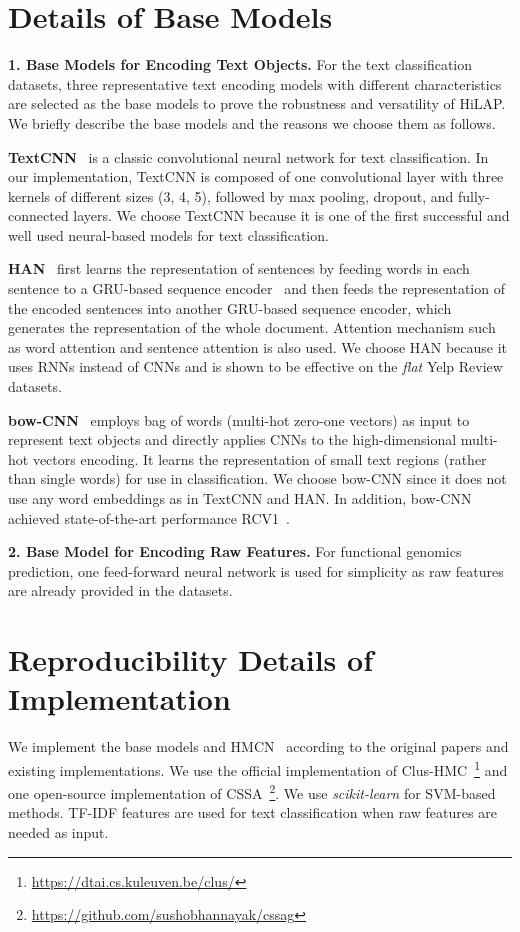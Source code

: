 \documentclass[11pt,a4paper]{article}
\begin{document}
\section{Details of Base Models}
\label{app_base}
\smallskip
\noindent
\textbf{1. Base Models for Encoding Text Objects.}
For the text classification datasets, three representative text encoding models with different characteristics are selected as the base models to prove the robustness and versatility of HiLAP.
We briefly describe the base models and the reasons we choose them as follows.

\textbf{TextCNN}~\citep{kim2014convolutional} is a classic convolutional neural network for text classification.
    In our implementation, TextCNN is composed of one convolutional layer with three kernels of different sizes (3, 4, 5), followed by max pooling, dropout, and fully-connected layers.
    We choose TextCNN because it is one of the first successful and well used neural-based models for text classification.

\textbf{HAN}~\citep{yang2016hierarchical}
    first learns the representation of sentences by feeding words in each sentence to a GRU-based sequence encoder~\citep{bahdanau2014neural} and then feeds the representation of the encoded sentences into another GRU-based sequence encoder, which generates the representation of the whole document.
    Attention mechanism such as word attention and sentence attention is also used.
    We choose HAN because it uses RNNs instead of CNNs and is shown to be effective on the \textit{flat} Yelp Review datasets.

\textbf{bow-CNN}~\citep{johnson2014effective} employs bag of words (multi-hot zero-one vectors) as input to represent text objects and directly applies CNNs to the high-dimensional multi-hot vectors encoding. It learns the representation of small text regions (rather than single words) for use in classification. We choose bow-CNN since it does not use any word embeddings as in TextCNN and HAN. In addition, bow-CNN achieved state-of-the-art performance RCV1~\citep{lewis2004rcv1}.

\smallskip
\noindent
\textbf{2. Base Model for Encoding Raw Features.}
For functional genomics prediction, one feed-forward neural network is used for simplicity as raw features are already provided in the datasets. 

\section{Reproducibility Details of Implementation}
\label{app_implementation}
We implement the base models and HMCN~\cite{wehrmann2018hierarchical} according to the original papers and existing implementations.
We use the official implementation of Clus-HMC~\cite{vens2008decision}\footnote{\url{https://dtai.cs.kuleuven.be/clus/}} and one open-source implementation of CSSA~\cite{bi2011multi}\footnote{\url{https://github.com/sushobhannayak/cssag}}.
We use \textit{scikit-learn} for SVM-based methods.
TF-IDF features are used for text classification when raw features are needed as input.
\end{document}
